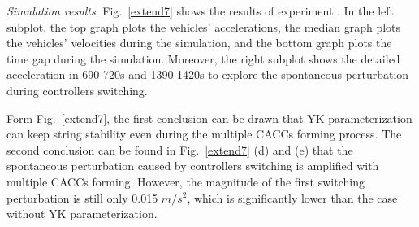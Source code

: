 \documentclass[journal]{IEEEtran}
\begin{document}
\textit{Simulation results}. Fig.~\ref{extend7} shows the results of experiment \uppercase\expandafter{}. In the left subplot, the top graph plots the vehicles' accelerations, the median graph plots the vehicles' velocities during the simulation, and the bottom graph plots the time gap during the simulation. Moreover, the right subplot shows the detailed acceleration in 690-720s and 1390-1420s to explore the spontaneous perturbation during controllers switching.

Form Fig.~\ref{extend7}, the first conclusion can be drawn that YK parameterization can keep string stability even during the multiple CACCs forming process. The second conclusion can be found in Fig.~\ref{extend7} (d) and (e) that the spontaneous perturbation caused by controllers switching is amplified with multiple CACCs forming. However, the magnitude of the first switching perturbation is still only 0.015 $m/s^2$, which is significantly lower than the case without YK parameterization.









\end{document}
